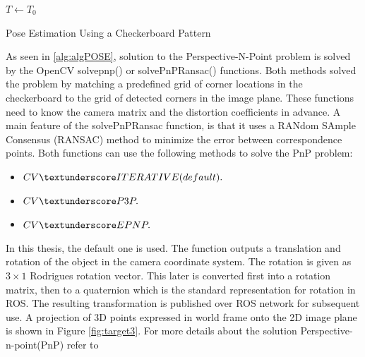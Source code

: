 \begin{algorithm}[H]
\SetAlgoLined
{}
 $T \leftarrow T_{0}$  \;
 {
}
\caption{Pose Estimation Using a Checkerboard Pattern}
\label{alg:algPOSE}
\end{algorithm}

As seen in \ref{alg:algPOSE}, solution to the Perspective-N-Point problem is solved by the OpenCV solvepnp() or solvePnPRansac() functions. Both methods solved the problem by matching a predefined grid of corner locations in the checkerboard to the grid of detected corners in the image plane. These functions need to know the camera matrix and the distortion coefficients in advance. A main feature of the solvePnPRansac function, is that it uses a RANdom SAmple Consensus (RANSAC) method to minimize the error between correspondence points. Both functions can use the following methods to solve the PnP problem:

\begin{itemize}
\item $CV \textunderscore ITERATIVE (default).$
\item $CV \textunderscore P3P.$
\item $CV \textunderscore EPNP.$
\end{itemize}

In this thesis, the default one is used. The function outputs a translation and rotation of the object in the camera coordinate system. The rotation is given as $3\times1$ Rodrigues rotation vector. This later is converted first
into a rotation matrix, then to a quaternion which is the
standard representation for rotation in ROS. The resulting transformation is published over ROS network for subsequent use. A projection of 3D points expressed in world frame onto the 2D image plane is shown in Figure \ref{fig:target3}. For more details about the solution Perspective-n-point(PnP) refer to \cite{pnp}


